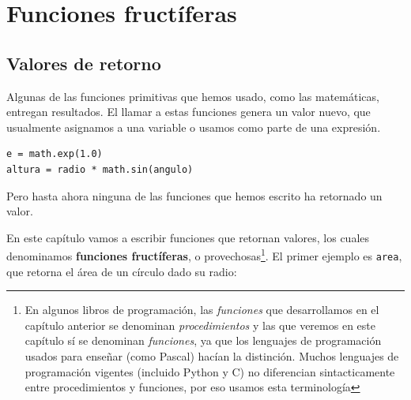 


\chapter{Funciones fructíferas}
\label{funcReturn}

\section{Valores de retorno}

Algunas de las funciones primitivas que hemos usado, como las matemáticas,
entregan resultados. El llamar a estas funciones genera un valor nuevo, que
usualmente asignamos a una variable o usamos como parte de una expresión.

\beforeverb
\begin{verbatim}
e = math.exp(1.0)
altura = radio * math.sin(angulo)
\end{verbatim}
\afterverb
%
Pero hasta ahora ninguna de las funciones que hemos escrito ha retornado
un valor.

En este capítulo vamos a escribir funciones que retornan valores, los
cuales denominamos {\bf funciones fructíferas}, o provechosas\footnote{En algunos
 libros de programación, las \textit{funciones} que desarrollamos en el capítulo
anterior se denominan \textit{procedimientos} y las que veremos en este 
capítulo sí se denominan \textit{funciones}, ya que los lenguajes de programación
usados para enseñar (como Pascal) hacían la distinción. Muchos lenguajes de
programación vigentes (incluido Python y C) no diferencian
sintacticamente entre procedimientos y funciones, por eso usamos esta 
terminología}. El primer ejemplo es \texttt{area}, que retorna el área
de un círculo dado su radio:

